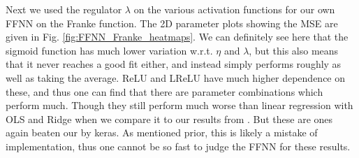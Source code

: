 \documentclass[%
reprint,
amsmath,amssymb,
aps,
]{revtex4-2}
\begin{document}
Next we used the regulator $\lambda$ on the various activation functions for our own FFNN on the Franke function. The 2D parameter plots showing the MSE are given in Fig. \ref{fig:FFNN_Franke_heatmaps}. We can definitely see here that the sigmoid function has much lower variation w.r.t. $\eta$ and $\lambda$, but this also means that it never reaches a good fit either, and instead simply performs roughly as well as taking the average. ReLU and LReLU have much higher dependence on these, and thus one can find that there are parameter combinations which perform much. Though they still perform much worse than linear regression with OLS and Ridge when we compare it to our results from \cite{project1}. But these are ones again beaten our by keras. As mentioned prior, this is likely a mistake of implementation, thus one cannot be so fast to judge the FFNN for these results.
\end{document}
